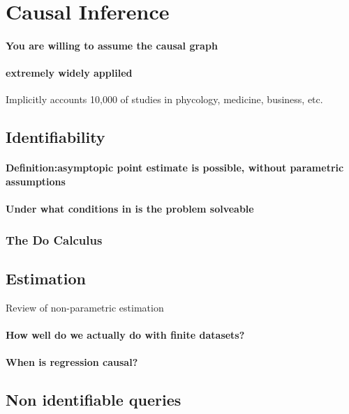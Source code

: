 \documentclass[11pt,a4paper,oneside]{book}
\begin{document}
 
\section*{Causal Inference} 
\paragraph*{You are willing to assume the causal graph}
\paragraph*{extremely widely appliled} Implicitly accounts 10,000 of studies in phycology, medicine, business, etc. 

\subsection*{Identifiability}
\paragraph*{Definition:asymptopic point estimate is possible, without parametric assumptions}
\paragraph*{Under what conditions in is the problem solveable}
\subsubsection*{The Do Calculus}


\subsection*{Estimation}
\cite{Imbens2004} Review of non-parametric estimation
\paragraph*{How well do we actually do with finite datasets?}

\paragraph*{When is regression causal?}


\subsection*{Non identifiable queries}
\end{document}
